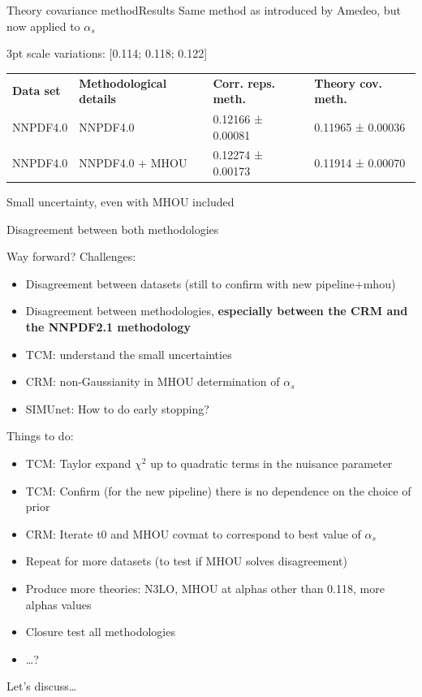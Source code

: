 \documentclass[aspectratio=169, 8pt,t]{beamer}
\begin{document}
\begin{frame}{Theory covariance method}{Results}
  Same method as introduced by Amedeo, but now applied to $\alpha_s$

  \vspace*{0.5em}
  3pt scale variations: [0.114; 0.118; 0.122]

  \vspace*{2em}

  \begin{table}[]
    \begin{tabular}{llll}
    \textbf{Data set} & \textbf{Methodological details} & \textbf{Corr. reps. meth.} & \textbf{Theory cov. meth.}       \\
    NNPDF4.0          & NNPDF4.0                        & 0.12166 ± 0.00081          & {0.11965 ± 0.00036} \\
    NNPDF4.0          & NNPDF4.0 + MHOU                 & 0.12274 ± 0.00173          & {0.11914 ± 0.00070}
    \end{tabular}
  \end{table}

  \vspace*{1em}
  Small uncertainty, even with MHOU included

  \vspace*{0.5em}
  Disagreement between both methodologies

\end{frame}



\begin{frame}{Way forward?}
  Challenges:
  \begin{itemize}
    \item Disagreement between datasets (still to confirm with new pipeline+mhou)
    \item Disagreement between methodologies, \textbf{especially between the CRM and the NNPDF2.1 methodology}
    \item TCM: understand the small uncertainties
    \item CRM: non-Gaussianity in MHOU determination of $\alpha_s$
    \item SIMUnet: How to do early stopping?
  \end{itemize}

  Things to do:
  \begin{itemize}
    \item TCM: Taylor expand $\chi^2$ up to quadratic terms in the nuisance parameter
    \item TCM: Confirm (for the new pipeline) there is no dependence on the choice of prior
    \item CRM: Iterate t0 and MHOU covmat to correspond to best value of $\alpha_s$
    \item Repeat for more datasets (to test if MHOU solves disagreement)
    \item Produce more theories: N3LO, MHOU at alphas other than 0.118, more alphas values
    \item Closure test all methodologies
    \item \ldots?
  \end{itemize}

  Let's discuss\ldots
\end{frame}
\end{document}
